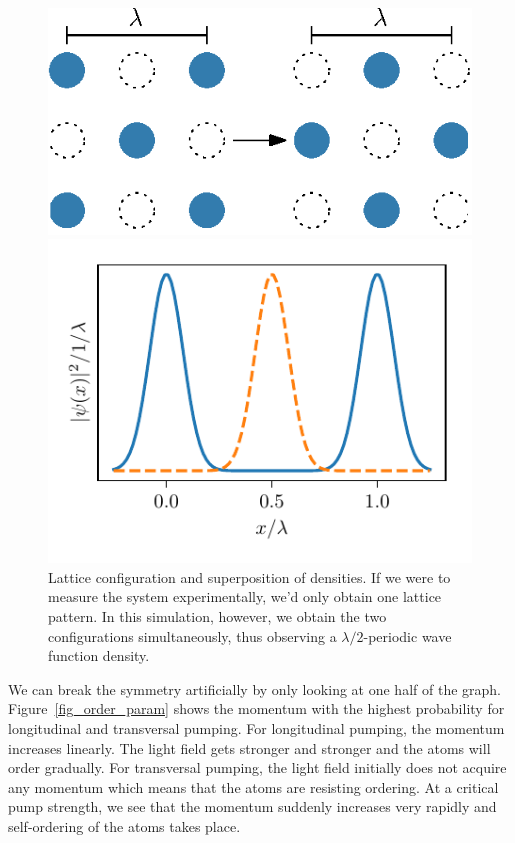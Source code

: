 \begin{figure}[!htb]
	\begin{minipage}[b]{.5\linewidth}
	\centering
	\includegraphics[width=.9\textwidth]{images/lattice_drawing.eps}
	\end{minipage}
%
	\begin{minipage}[b]{.5\linewidth}
	\centering
	\includegraphics[width=.9\textwidth]{images/density_superposition.pdf}
	\end{minipage}
\caption{Lattice configuration and superposition of densities. If we were to measure the system experimentally, we'd only obtain one lattice pattern. In this simulation, however, we obtain the two configurations simultaneously, thus observing a $\lambda/2$-periodic wave function density.}
\label{densities_superposition}
\end{figure}
\FloatBarrier

\noindent We can break the symmetry artificially by only looking at one half of the graph. Figure~\ref{fig_order_param} shows the momentum with the highest probability for longitudinal and transversal pumping. For longitudinal pumping, the momentum increases linearly. The light field gets stronger and stronger and the atoms will order gradually. For transversal pumping, the light field initially does not acquire any momentum which means that the atoms are resisting ordering. At a critical pump strength, we see that the momentum suddenly increases very rapidly and self-ordering of the atoms takes place.

